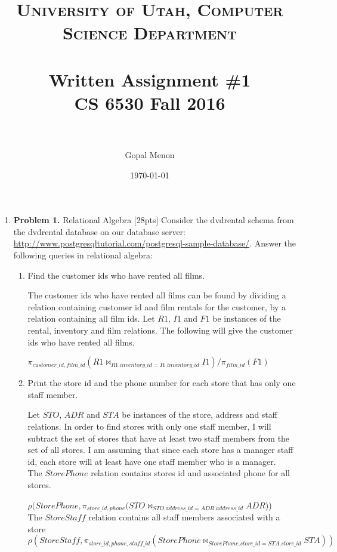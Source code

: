 \documentclass[paper=a4, fontsize=11pt]{scrartcl} %
\title{	
\normalfont \normalsize 
\textsc{University of Utah, Computer Science Department} \\ [25pt] %
\horrule{0.5pt} \\[0.4cm] %
\huge Written Assignment \#1\\CS 6530 Fall 2016\\ %
\horrule{2pt} \\[0.5cm] %
}
\author{Gopal Menon} %
\date{\normalsize\today} %
\numberwithin{figure}{section} %
\numberwithin{table}{section} %
\begin{document}
\maketitle %

\begin{enumerate}

\item \textbf{Problem 1.} Relational Algebra [28pts]
Consider the dvdrental schema from the dvdrental database on our database server: \url{http://www.postgresqltutorial.com/postgresql-sample-database/}. Answer the following queries in relational algebra:

\begin{enumerate}

\item Find the customer ids who have rented all films. 

The customer ids who have rented all films can be found by dividing a relation containing customer id and film rentals for the customer, by a relation containing all film ids. Let $R1$, $I1$ and $F1$ be instances of the rental, inventory and film relations. The following will give the customer ids who have rented all films.

$\pi_{customer\_id, film\_id} (R1 \bowtie_{R1.inventory\_id = I1.inventory\_id} I1) / \pi_{film\_id} (F1)$

\item Print the store id and the phone number for each store that has only one staff member.

Let $STO$, $ADR$ and $STA$ be instances of the store, address and staff relations. In order to find stores with only one staff member, I will subtract the set of stores that have at least two staff members from the set of all stores. I am assuming that since each store has a manager staff id, each store will at least have one staff member who is a manager.\\

The $StorePhone$ relation contains stores id and associated phone for all stores.

$\rho(StorePhone, \pi_{store\_id, phone} (STO \bowtie_{STO.address\_id = ADR.address\_id} ADR$))\\

The $StoreStaff$ relation contains all staff members associated with a store\\

$\rho(StoreStaff, \pi_{store\_id, phone, staff\_id}(StorePhone \bowtie_{StorePhone.store\_id = STA.store\_id} STA))$\\


\end{enumerate}
\end{enumerate}
\end{document}
